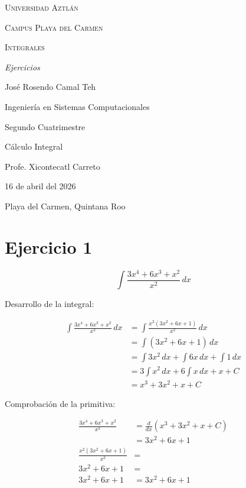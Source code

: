\documentclass[12pt]{article}
\begin{document}
\begin{titlepage}
	\centering
	{\scshape\LARGE Universidad Aztlán \par}
	\vspace{1cm}
	{\scshape\Large Campus Playa del Carmen \par}
	\vspace{3cm}
	{\scshape\Huge Integrales \par}
	\vspace{1cm}
	{\itshape\Large Ejercicios \par}
	\vspace{3cm}
	{\Large José Rosendo Camal Teh \par}
	\vfill
	{\Large Ingeniería en Sistemas Computacionales \par}
	{\Large Segundo Cuatrimestre \par}
	{\Large Cálculo Integral \par}
	\vfill
	{\Large Profe. Xicontecatl Carreto \par}
	\vfill
	{\Large 16 de abril del 2026}
	\vfill
	{\Large Playa del Carmen, Quintana Roo \par}
\end{titlepage}

\section*{Ejercicio 1}

\[ \int \frac{3x^{4} + 6x^{3} + x^{2}}{x^{2}} \, dx \]

Desarrollo de la integral:

\begin{align*}
	\int \frac{3x^{4} + 6x^{3} + x^{2}}{x^{2}} \, dx &= \int \frac{x^{2} \left( 3x^{2} + 6x + 1 \right)}{x^{2}} \, dx \\
	&= \int \left( 3x^{2} + 6x + 1 \right) \, dx \\
	&= \int 3x^{2} \, dx + \int 6x \, dx + \int 1 \, dx \\
	&= 3 \int x^{2} \, dx + 6 \int x \, dx + x + C \\
	&= x^{3} + 3x^{2} + x + C
\end{align*}

Comprobación de la primitiva:

\begin{align*}
	\frac{3x^{4} + 6x^{3} + x^{2}}{x^{2}} &= \frac{d}{dx} \left( x^{3} + 3x^{2} + x + C \right) \\
	&= 3x^{2} + 6x + 1 \\
	\frac{x^{2} \left( 3x^{2} + 6x + 1 \right)}{x^{2}} &= \\
	3x^{2} + 6x + 1 &= \\
	3x^{2} + 6x + 1 &= 3x^{2} + 6x + 1
\end{align*}
\end{document}
